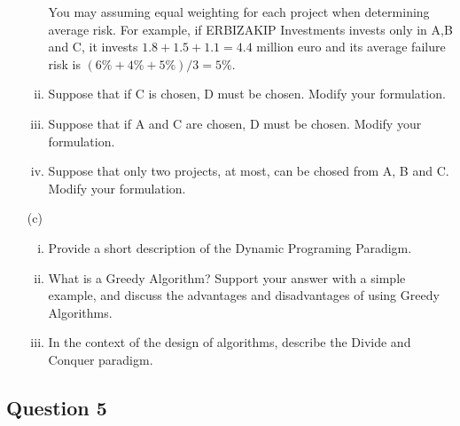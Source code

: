 \documentclass[12pt]{article}
\begin{document}
\begin{itemize}
\begin{enumerate}[(i)]
				You may assuming equal weighting for each project when determining average risk.
                For example, if ERBIZAKIP Investments invests only in A,B and C, it invests $1.8 + 1.5 + 1.1 =
				 4.4$ million euro and its average failure risk is $(6\%+4\% +5\%)/3=5\%$.
				
				\item Suppose that if C is chosen, D must be chosen. Modify your
				formulation.
				\item   Suppose that if A and C are chosen, D must be chosen. Modify your
				formulation.
				\item Suppose that only two projects, at most, can be chosed from A, B and C.  Modify your
				formulation.
			\end{enumerate}
	
			\item[(c)]
			\begin{enumerate}[(i)]

				
							\item Provide a short description of the Dynamic Programing Paradigm.  
							\item What is a Greedy Algorithm? Support your answer with a simple example, and discuss the advantages and disadvantages of using Greedy Algorithms.   															
								\item In the context of the design of algorithms, describe the Divide and Conquer paradigm. 
			\end{enumerate}

		\end{itemize}
		
		\subsection*{Question 5}
		
		
\end{document}
